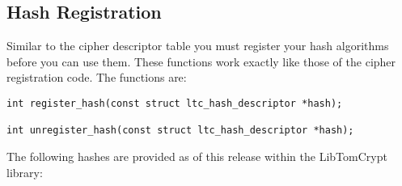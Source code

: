 \documentclass[synpaper]{book}
\begin{document}
\subsection{Hash Registration}
Similar to the cipher descriptor table you must register your hash algorithms before you can use them.  These functions
work exactly like those of the cipher registration code.  The functions are:
 
\begin{verbatim}
int register_hash(const struct ltc_hash_descriptor *hash);

int unregister_hash(const struct ltc_hash_descriptor *hash);
\end{verbatim}

The following hashes are provided as of this release within the LibTomCrypt library:
\end{document}
